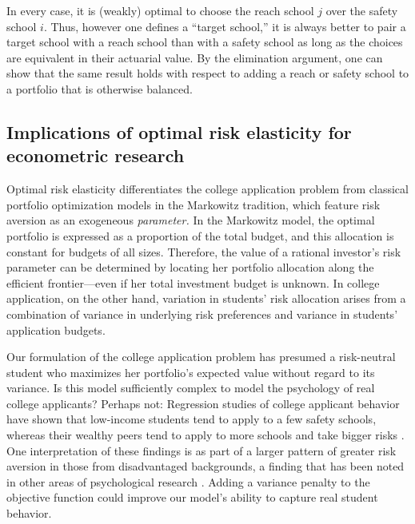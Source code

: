 \noindent In every case, it is (weakly) optimal to choose the reach school $j$ over the safety school $i$. Thus, however one defines a ``target school,'' it is always better to pair a target school with a reach school than with a safety school as long as the choices are equivalent in their actuarial value. By the elimination argument, one can show that the same result holds with respect to adding a reach or safety school to a portfolio that is otherwise balanced.

\subsection{Implications of optimal risk elasticity for econometric research}

Optimal risk elasticity differentiates the college application problem from classical portfolio optimization models in the Markowitz \cite{markowitz1952} tradition, which feature risk aversion as an exogeneous \emph{parameter.} In the Markowitz model, the optimal portfolio is expressed as a proportion of the total budget, and this allocation is constant for budgets of all sizes. Therefore, the value of a rational investor's risk parameter can be determined by locating her portfolio allocation along the efficient frontier---even if her total investment budget is unknown. In college application, on the other hand, variation in students' risk allocation arises from a combination of variance in underlying risk preferences and variance in students' application budgets. 

Our formulation of the college application problem has presumed a risk-neutral student who maximizes her portfolio's expected value without regard to its variance. Is this model sufficiently complex to model the psychology of real college applicants? Perhaps not: Regression studies of college applicant behavior have shown that low-income students tend to apply to a few safety schools, whereas their wealthy peers tend to apply to more schools and take bigger risks \cite{hoxbyandavery2012}. One interpretation of these findings is as part of a larger pattern of greater risk aversion in those from disadvantaged backgrounds, a finding that has been noted in other areas of psychological research \cite{hartlaubandschneider2012,wattsetal2018,vanhuizenandalessie2019}. Adding a variance penalty to the objective function could improve our model's ability to capture real student behavior.



